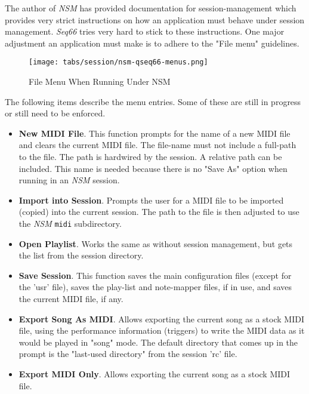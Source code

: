    The author of \textsl{NSM} has provided documentation for session-management
   which provides very strict instructions on how an application must behave
   under session management.  \textsl{Seq66} tries very hard to stick to these
   instructions.  One major adjustment an application must make is to adhere to
   the "File menu" guidelines.

\begin{figure}[H]
   \centering 
   \texttt{[image: tabs/session/nsm-qseq66-menus.png]}
   \caption*{File Menu When Running Under NSM}
\end{figure}

   The following items describe the menu entries.  Some of these are still in
   progress or still need to be enforced.

   \begin{itemize}
      \item \textbf{New MIDI File}.
         This function prompts for the name of a
         new MIDI file and clears the current MIDI file.  The file-name must not
         include a full-path to the file.  The path is hardwired by the
         session.  A relative path can be included.  This name is needed
         because there is no "Save As" option when running in an \textsl{NSM}
         session.
      \item \textbf{Import into Session}.
         Prompts the user for a MIDI file to
         be imported (copied) into the current session.  The path to the file
         is then adjusted to use the \textsl{NSM} \texttt{midi} subdirectory.
      \item \textbf{Open Playlist}.
         Works the same as without session
         management, but gets the list from the session directory.
      \item \textbf{Save Session}.
         This function saves the main configuration
         files (except for the 'usr' file), saves the play-list and note-mapper
         files, if in use, and saves the current MIDI file, if any.
      \item \textbf{Export Song As MIDI}.
         Allows exporting the current song as a stock MIDI file, using the
         performance information (triggers) to write the MIDI data as it would
         be played in "song" mode.
         The default directory that comes up in the
         prompt is the "last-used directory" from the session 'rc' file.
      \item \textbf{Export MIDI Only}.
         Allows exporting the current song as a stock MIDI file.

\end{itemize}
